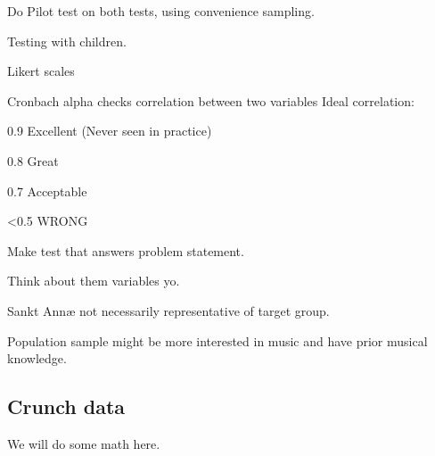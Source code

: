 Do Pilot test on both tests, using convenience sampling.

Testing with children\cite[p.~207]{bjoernerBog}.

Likert scales

Cronbach alpha checks correlation between two variables
Ideal correlation:

0.9 Excellent (Never seen in practice)

0.8 Great

0.7 Acceptable

<0.5 WRONG

Make test that answers problem statement.

Think about them variables yo.

Sankt Annæ not necessarily representative of target group.

Population sample might be more interested in music and have prior musical knowledge.

\subsection{Crunch data}
	We will do some math here.\cite{nyBog}